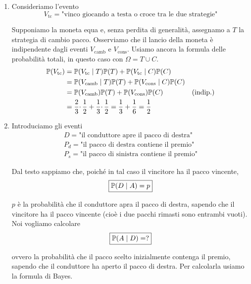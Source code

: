 \begin{enumerate}
\item Consideriamo l'evento\begin{equation*}
V_{\text{tc}} =\text{"vinco giocando a testa o croce tra le due strategie"}
\end{equation*}

Supponiamo la moneta equa e, senza perdita di generalità, assegnamo a $T$ la strategia di cambio pacco. Osserviamo che il lancio della moneta è indipendente dagli eventi $V_{\text{camb}}$ e $V_{\text{cons}}$. Usiamo ancora la formula delle probabilità totali, in questo caso con $\Omega =T\cup C$.\begin{equation*}
\begin{aligned}
\mathbb{P}( V_{\text{tc}}) & =\mathbb{P}( V_{\text{tc}} \mid T)\mathbb{P}( T) +\mathbb{P}( V_{\text{tc}} \mid C)\mathbb{P}( C) & \\
 & =\mathbb{P}( V_{\text{camb}} \mid T)\mathbb{P}( T) +\mathbb{P}( V_{\text{cons}} \mid C)\mathbb{P}( C) & \\
 & =\mathbb{P}( V_{\text{camb}})\mathbb{P}( T) +\mathbb{P}( V_{\text{cons}})\mathbb{P}( C) & \text{(indip.)}\\
 & =\frac{2}{3} \cdotp \frac{1}{2} +\frac{1}{3} \cdotp \frac{1}{2} =\frac{1}{3} +\frac{1}{6} =\frac{1}{2} & 
\end{aligned}
\end{equation*}
\item Introduciamo gli eventi\begin{gather*}
D=\text{"il conduttore apre il pacco di destra"}\\
P_{d} =\text{"il pacco di destra contiene il premio"}\\
P_{s} =\text{"il pacco di sinistra contiene il premio"}
\end{gather*}

Dal testo sappiamo che, poiché in tal caso il vincitore ha il pacco vincente,\begin{equation*}
\boxed{\mathbb{P}( D\mid A) =p}
\end{equation*}

$p$ è la probabilità che il conduttore apra il pacco di destra, sapendo che il vincitore ha il pacco vincente (cioè i due pacchi rimasti sono entrambi vuoti). Noi vogliamo calcolare\begin{equation*}
\boxed{\mathbb{P}( A\mid D) =?}
\end{equation*}

ovvero la probabilità che il pacco scelto inizialmente contenga il premio, sapendo che il conduttore ha aperto il pacco di destra. Per calcolarla usiamo la formula di Bayes.


\end{enumerate}

